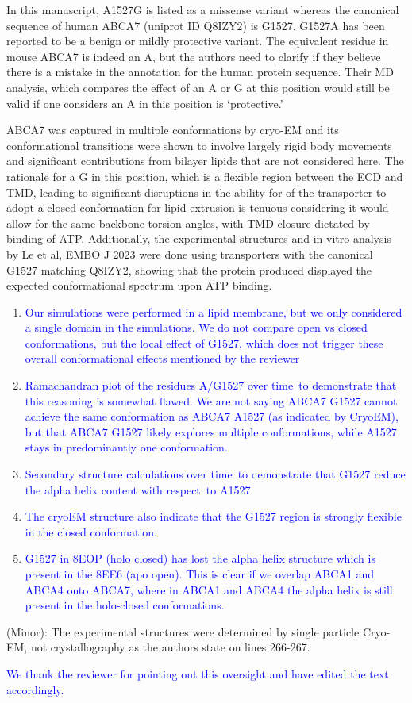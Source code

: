 In this manuscript, A1527G is listed as a missense variant whereas the canonical sequence of human ABCA7 (uniprot ID Q8IZY2) is G1527. G1527A has been reported to be a benign or mildly protective variant. The equivalent residue in mouse ABCA7 is indeed an A, but the authors need to clarify if they believe there is a mistake in the annotation for the human protein sequence. Their MD analysis, which compares the effect of an A or G at this position would still be valid if one considers an A in this position is ‘protective.’

ABCA7 was captured in multiple conformations by cryo-EM and its conformational transitions were shown to involve largely rigid body movements and significant contributions from bilayer lipids that are not considered here. The rationale for a G in this position, which is a flexible region between the ECD and TMD, leading to significant disruptions in the ability for of the transporter to adopt a closed conformation for lipid extrusion is tenuous considering it would allow for the same backbone torsion angles, with TMD closure dictated by binding of ATP. Additionally, the experimental structures and in vitro analysis by Le et al, EMBO J 2023 were done using transporters with the canonical G1527 matching Q8IZY2, showing that the protein produced displayed the expected conformational spectrum upon ATP binding.

\begin{enumerate}
    \item \textcolor{blue}{Our simulations were performed in a lipid membrane, but we only considered a single domain in the simulations. We do not compare open vs closed conformations, but the local effect of G1527, which does not trigger these overall conformational effects mentioned by the reviewer}
    \item \textcolor{blue}{Ramachandran plot of the residues A/G1527 over time to demonstrate that this reasoning is somewhat flawed. We are not saying ABCA7 G1527 cannot achieve the same conformation as ABCA7 A1527 (as indicated by CryoEM), but that ABCA7 G1527 likely explores multiple conformations, while A1527 stays in predominantly one conformation.}
    \item \textcolor{blue}{Secondary structure calculations over time to demonstrate that G1527 reduce the alpha helix content with respect to A1527}
    \item \textcolor{blue}{The cryoEM structure also indicate that the G1527 region is strongly flexible in the closed conformation.}
    \item \textcolor{blue}{G1527 in 8EOP (holo closed) has lost the alpha helix structure which is present in the 8EE6 (apo open). This is clear if we overlap ABCA1 and ABCA4 onto ABCA7, where in ABCA1 and ABCA4 the alpha helix is still present in the holo-closed conformations.}
\end{enumerate}

(Minor): The experimental structures were determined by single particle Cryo-EM, not crystallography as the authors state on lines 266-267.

\textcolor{blue}{We thank the reviewer for pointing out this oversight and have edited the text accordingly.}
